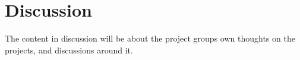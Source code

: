 \chapter{Discussion}
 The content in discussion will be about the project groups own thoughts on the projects, and discussions around it.